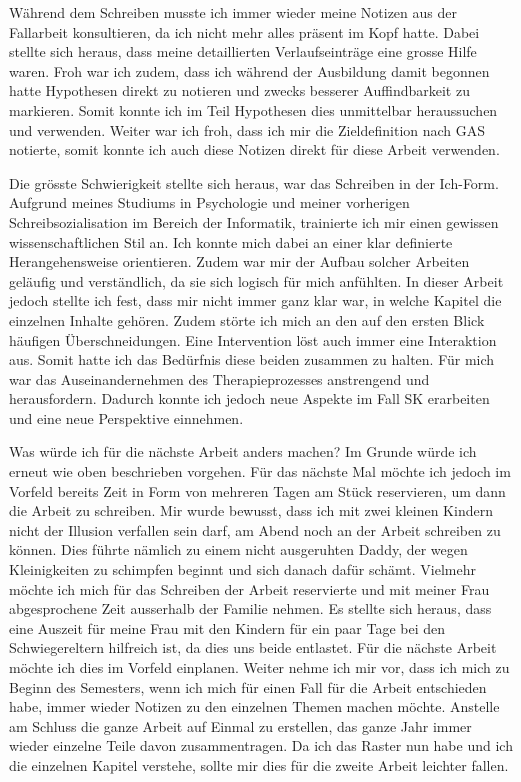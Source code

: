 Während dem Schreiben musste ich immer wieder meine Notizen aus der Fallarbeit konsultieren, da ich nicht mehr alles präsent im Kopf hatte. Dabei stellte sich heraus, dass meine detaillierten Verlaufseinträge eine grosse Hilfe waren. Froh war ich zudem, dass ich während der Ausbildung damit begonnen hatte Hypothesen direkt zu notieren und zwecks besserer Auffindbarkeit zu markieren. Somit konnte ich im Teil Hypothesen dies unmittelbar heraussuchen und verwenden. Weiter war ich froh, dass ich mir die Zieldefinition nach GAS notierte, somit konnte ich auch diese Notizen direkt für diese Arbeit verwenden. 

Die grösste Schwierigkeit stellte sich heraus, war das Schreiben in der Ich-Form. Aufgrund meines Studiums in Psychologie und meiner vorherigen Schreibsozialisation im Bereich der Informatik, trainierte ich mir einen gewissen wissenschaftlichen Stil an. Ich konnte mich dabei an einer klar definierte Herangehensweise orientieren. Zudem war mir der Aufbau solcher Arbeiten geläufig und verständlich, da sie sich logisch für mich anfühlten. In dieser Arbeit jedoch stellte ich fest, dass mir nicht immer ganz klar war, in welche Kapitel die einzelnen Inhalte gehören. Zudem störte ich mich an den auf den ersten Blick häufigen Überschneidungen. Eine Intervention löst auch immer eine Interaktion aus. Somit hatte ich das Bedürfnis diese beiden zusammen zu halten. Für mich war das Auseinandernehmen des Therapieprozesses anstrengend und herausfordern. Dadurch konnte ich jedoch neue Aspekte im Fall SK erarbeiten und eine neue Perspektive einnehmen. 

Was würde ich für die nächste Arbeit anders machen? Im Grunde würde ich erneut wie oben beschrieben vorgehen. Für das nächste Mal möchte ich jedoch im Vorfeld bereits Zeit in Form von mehreren Tagen am Stück reservieren, um dann die Arbeit zu schreiben. Mir wurde bewusst, dass ich mit zwei kleinen Kindern nicht der Illusion verfallen sein darf, am Abend noch an der Arbeit schreiben zu können. Dies führte nämlich zu einem nicht ausgeruhten Daddy, der wegen Kleinigkeiten zu schimpfen beginnt und sich danach dafür schämt. Vielmehr möchte ich mich für das Schreiben der Arbeit reservierte und mit meiner Frau abgesprochene Zeit ausserhalb der Familie nehmen. Es stellte sich heraus, dass eine Auszeit für meine Frau mit den Kindern für ein paar Tage bei den Schwiegereltern hilfreich ist, da dies uns beide entlastet. Für die nächste Arbeit möchte ich dies im Vorfeld einplanen. Weiter nehme ich mir vor, dass ich mich zu Beginn des Semesters, wenn ich mich für einen Fall für die Arbeit entschieden habe, immer wieder Notizen zu den einzelnen Themen machen möchte. Anstelle am Schluss die ganze Arbeit auf Einmal zu erstellen, das ganze Jahr immer wieder einzelne Teile davon zusammentragen. Da ich das Raster nun habe und ich die einzelnen Kapitel verstehe, sollte mir dies für die zweite Arbeit leichter fallen. 


